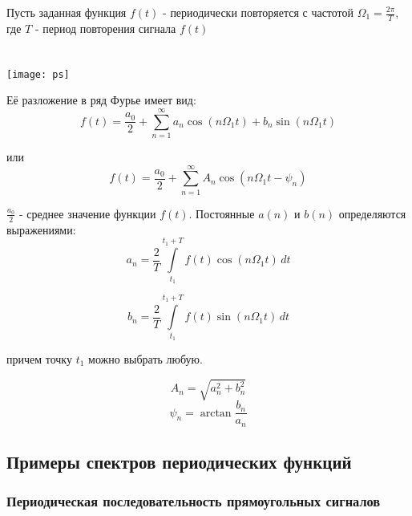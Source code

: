 \documentclass[a4paper,12pt]{article}
\begin{document}
Пусть заданная функция $f(t)$ - периодически повторяется с частотой $\Omega_{1}=\frac{2\pi}{T}$, где $T$ - период повторения сигнала $f(t)$
\ \\
\ \\
\ \\
\texttt{[image: ps]}

Её разложение в ряд Фурье имеет вид: \ \\
\begin{equation}
\label{form:furie}	
	f(t)=\frac{a_{0}}{2}+\sum\limits_{n=1}^{\infty}a_{n}\cos(n\Omega_{1}t)+b_{n}\sin(n\Omega_{1}t) 
\end{equation}

или
\begin{equation}
	f(t)=\frac{a_{0}}{2}+\sum\limits_{n=1}^{\infty}A_{n}\cos(n\Omega_{1}t-\psi_{n}) 
\label{form:furie_2}
\end{equation}

$\frac{a_{0}}{2}$ - среднее значение функции $f(t)$. Постоянные $a(n)$ и $b(n)$ определяются выражениями:
\begin{equation}
\label{form:a_n}
	a_{n} = \frac{2}{T}\int\limits_{t_{1}}^{t_{1}+T}f(t)\cos(n\Omega_1t)\, dt
\end{equation}

\begin{equation}
	b_{n} = \frac{2}{T}\int\limits_{t_{1}}^{t_{1}+T}f(t)\sin(n\Omega_{1}t)\, dt 
\label{form:b_n}
\end{equation}

причем точку $t_{1}$ можно выбрать любую.

\begin{equation}
\label{form:A_n}
	A_{n} = \sqrt{a_{n}^2+b_{n}^2}
\end{equation}
\begin{equation}
	\psi_{n} = \arctan\frac{b_{n}}{a_{n}}
\label{form:psi_n}
\end{equation}

\newpage
\subsection{Примеры спектров периодических функций}   
\subsubsection*{Периодическая последовательность прямоугольных сигналов}
\ \\
\ \\
\ \\
\end{document}
